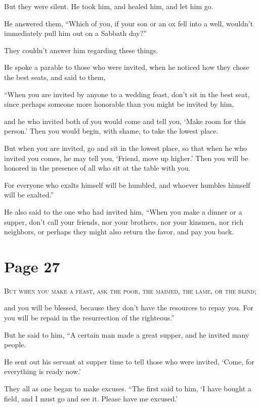 But they were silent. He took him, and healed him, and let him go.

He answered them, “Which of you, if your son or an ox fell into a well, wouldn’t immediately pull him out on a Sabbath day?”

They couldn’t answer him regarding these things.

He spoke a parable to those who were invited, when he noticed how they chose the best seats, and said to them,

“When you are invited by anyone to a wedding feast, don’t sit in the best seat, since perhaps someone more honorable than you might be invited by him,

and he who invited both of you would come and tell you, ‘Make room for this person.’ Then you would begin, with shame, to take the lowest place.

But when you are invited, go and sit in the lowest place, so that when he who invited you comes, he may tell you, ‘Friend, move up higher.’ Then you will be honored in the presence of all who sit at the table with you.

For everyone who exalts himself will be humbled, and whoever humbles himself will be exalted.”

He also said to the one who had invited him, “When you make a dinner or a supper, don’t call your friends, nor your brothers, nor your kinsmen, nor rich neighbors, or perhaps they might also return the favor, and pay you back.



\chapterornament
\section*{Page 27}

\lettrine{B}{ut when you make a feast, ask the poor, the maimed, the lame, or the blind;}

and you will be blessed, because they don’t have the resources to repay you. For you will be repaid in the resurrection of the righteous.”

But he said to him, “A certain man made a great supper, and he invited many people.

He sent out his servant at supper time to tell those who were invited, ‘Come, for everything is ready now.’

They all as one began to make excuses. “The first said to him, ‘I have bought a field, and I must go and see it. Please have me excused.’

